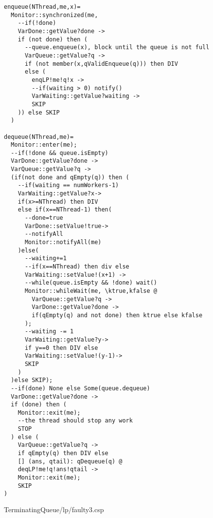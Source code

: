 \begin{lstlisting}
enqueue(NThread,me,x)=
  Monitor::synchronized(me,
    --if(!done)
    VarDone::getValue?done ->
    if (not done) then (
      --queue.enqueue(x), block until the queue is not full
      VarQueue::getValue?q ->
      if (not member(x,qValidEnqueue(q))) then DIV
      else (
        enqLP!me!q!x ->
        --if(waiting > 0) notify()
        VarWaiting::getValue?waiting ->
        SKIP
    )) else SKIP
  )
  
dequeue(NThread,me)=
  Monitor::enter(me);
  --if(!done && queue.isEmpty)
  VarDone::getValue?done ->
  VarQueue::getValue?q ->
  (if(not done and qEmpty(q)) then (
    --if(waiting == numWorkers-1)
    VarWaiting::getValue?x->
    if(x>=NThread) then DIV
    else if(x==NThread-1) then(
      --done=true
      VarDone::setValue!true->
      --notifyAll
      Monitor::notifyAll(me)
    )else(
      --waiting+=1
      --if(x==NThread) then div else
      VarWaiting::setValue!(x+1) ->
      --while(queue.isEmpty && !done) wait()
      Monitor::whileWait(me, \ktrue,kfalse @
        VarQueue::getValue?q ->
        VarDone::getValue?done ->
        if(qEmpty(q) and not done) then ktrue else kfalse
      );
      --waiting -= 1
      VarWaiting::getValue?y->
      if y==0 then DIV else 
      VarWaiting::setValue!(y-1)->
      SKIP
    )
  )else SKIP);
  --if(done) None else Some(queue.dequeue)
  VarDone::getValue?done ->
  if (done) then (
    Monitor::exit(me);
    --the thread should stop any work
    STOP
  ) else (
    VarQueue::getValue?q ->
    if qEmpty(q) then DIV else
    [] (ans, qtail): qDequeue(q) @
    deqLP!me!q!ans!qtail ->
    Monitor::exit(me);
    SKIP
)
\end{lstlisting}
TerminatingQueue/lp/faulty3.csp
